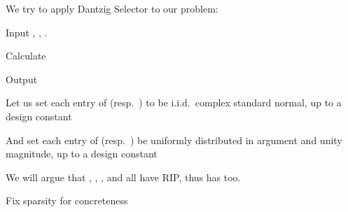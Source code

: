 {
\I We try to apply Dantzig Selector to our problem:

\I Input , , .

\I Calculate

\I Output 
}
{
\I Let us set each entry of  (resp.\ ) to be i.i.d.\ complex standard normal, up to a design constant

\I And set each entry of  (resp.\ ) be uniformly distributed in argument and unity magnitude, up to a design constant

\I We will argue that , , , and  all have RIP, thus  has too.

\I Fix sparsity  for concreteness
}



